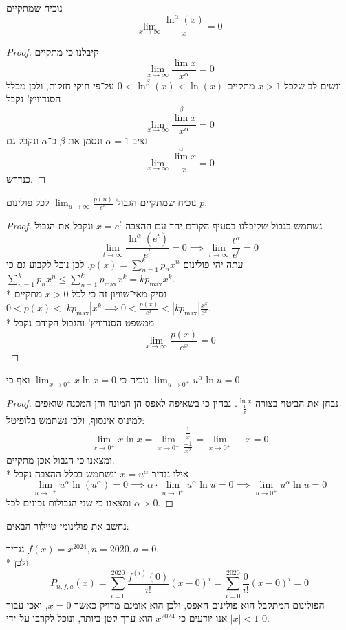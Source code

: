 \Subquestion{}
נוכיח שמתקיים
\[
	\lim_{x \to \infty} \frac{\ln^\alpha(x)}{x} = 0
\]
\begin{proof}
	קיבלנו כי מתקיים
	\[
		\lim_{x \to \infty} \frac{\lim x}{x^\alpha} = 0
	\]
	ונשים לב שלכל $x > 1$ מתקיים $0 < \ln^\beta(x) < \ln(x)$ על־פי חוקי חזקות, ולכן מכלל הסנדוויץ' נקבל
	\[
		\lim_{x \to \infty} \frac{\lim^\beta x}{x^\alpha} = 0
	\]
	נציב $\alpha = 1$ ונסמן את $\beta$ כ־$\alpha$ ונקבל גם
	\[
		\lim_{x \to \infty} \frac{\lim^\alpha x}{x} = 0
	\]
	כנדרש.
\end{proof}

\Subquestion{}
נוכיח שמתקיים הגבול $\lim_{u \to \infty} \frac{p(u)}{e^u}$ לכל פולינום $p$.
\begin{proof}
	נשתמש בגבול שקיבלנו בסעיף הקודם יחד עם ההצבה $x = e^t$ ונקבל את הגבול
	\[
		\lim_{t \to \infty} \frac{\ln^\alpha(e^t)}{e^t} = 0
		\implies
		\lim_{t \to \infty} \frac{t^\alpha}{e^t} = 0
	\]
	עתה יהי פולינום $p(x) = \sum_{n = 1}^{k} p_n x^n$. לכן נוכל לקבוע גם כי $\sum_{n = 1}^{k} p_n x^n \le \sum_{n = 1}^{k} p_{\max} x^k = k p_{\max} x^k$. \\*
	נסיק מאי־שוויון זה כי לכל $x > 0$ מתקיים $0 < p(x) < |k p_{\max}| x^k \implies 0 < \frac{p(x)}{e^x} < |k p_{\max}| \frac{x^k}{e^x}$. \\*
	ממשפט הסנדוויץ' והגבול הקודם נקבל
	\[
		\lim_{x \to \infty} \frac{p(x)}{e^x} = 0
	\]
\end{proof}

\Subquestion{}
נוכיח כי $\lim_{x \to 0^+}  x \ln x = 0$ ואף כי $\lim_{u \to 0^+} u^\alpha \ln u = 0$.
\begin{proof}
	נבחן את הביטוי בצורה $\frac{\ln x}{\frac{1}{x}}$. נבחין כי בשאיפה לאפס הן המונה והן המכנה שואפים למינוס אינסוף, ולכן נשתמש בלופיטל:
	\[
		\lim_{x \to 0^+} x \ln x 
		= \lim_{x \to 0^+} \frac{\frac{1}{x}}{\frac{-1}{x^2}} 
		= \lim_{x \to 0^+} -x
		= 0
	\]
	ומצאנו כי הגבול אכן מתקיים. \\*
	אילו נגדיר $x = u^\alpha$ ונשתמש בכלל ההצבה נקבל
	\[
		\lim_{u \to 0^+} u^\alpha \ln(u^\alpha) = 0
		\implies
		\alpha \cdot \lim_{u \to 0^+} u^\alpha \ln u = 0
		\implies
		\lim_{u \to 0^+} u^\alpha \ln u = 0
	\]
	ומצאנו כי שני הגבולות נכונים לכל $\alpha > 0$.
\end{proof}

\Question{}
נחשב את פולינומי טיילור הבאים:

\Subquestion{}
נגדיר $f(x) = x^{2024}, n = 2020, a = 0$, \\*
ולכן
\[
	P_{n, f, a}(x)
	= \sum_{i = 0}^{2020} \frac{f^{(i)}(0)}{i!} {(x - 0)}^i
	= \sum_{i = 0}^{2020} \frac{0}{i!} {(x - 0)}^i
	= 0
\]
הפולינום המתקבל הוא פולינום האפס, ולכן הוא אומנם מדויק כאשר $x = 0$, ואכן עבור $|x| < 1$ אנו יודעים כי $x^{2024}$ הוא ערך קטן ביותר, ונוכל לקרבו על־ידי $0$.

